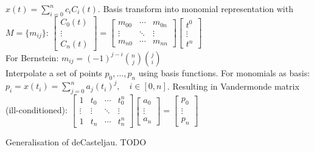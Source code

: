  $x(t) = \sum_{i=0}^nc_iC_i(t)$. Basis transform into monomial representation with $M=\{m_{ij}\}$:
$
\begin{bmatrix}
C_0(t) \\
\vdots \\
C_n(t)
\end{bmatrix}
=
\begin{bmatrix}
m_{00} & \cdots & m_{0n} \\
\vdots & \ddots & \vdots \\
m_{n0} & \cdots & m_{nn}
\end{bmatrix}
\begin{bmatrix}
t^0 \\
\vdots \\
t^n
\end{bmatrix}
$
\\
For Bernstein: $m_{ij} = (-1)^{j-i} \binom{n}{j} \binom{j}{i}$
\\
 Interpolate a set of points $p_0, ..., p_n$ using basis functions. For monomials as basis: $p_i = x(t_i) = \sum_{j=0}^{n} a_j(t_i)^j, \quad i \in [0,n]$. Resulting in Vandermonde matrix (ill-conditioned): 
$
\begin{bmatrix}
1 & t_0 & \cdots & t_0^n \\
\vdots & \vdots & \ddots & \vdots \\
1 & t_n & \cdots & t_n^n
\end{bmatrix}
\begin{bmatrix}
a_0 \\
\vdots \\
a_n
\end{bmatrix}
=
\begin{bmatrix}
p_0 \\
\vdots \\
p_n
\end{bmatrix}
$

 Generalisation of deCasteljau. TODO
